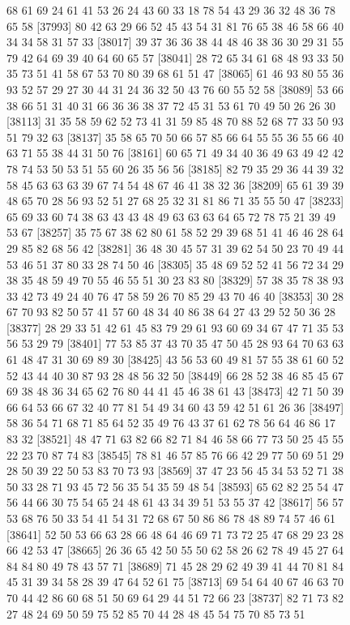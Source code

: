 \documentclass{article}
\begin{document}
\begin{figure}[H]
\begin{Schunk}
\begin{Soutput}
[37969] 68 61 69 24 61 41 53 26 24 43 60 33 18 78 54 43 29 36 32 48 36 78 65 58
[37993] 80 42 63 29 66 52 45 43 54 31 81 76 65 38 46 58 66 40 34 34 58 31 57 33
[38017] 39 37 36 36 38 44 48 46 38 36 30 29 31 55 79 42 64 69 39 40 64 60 65 57
[38041] 28 72 65 34 61 68 48 93 33 50 35 73 51 41 58 67 53 70 80 39 68 61 51 47
[38065] 61 46 93 80 55 36 93 52 57 29 27 30 44 31 24 36 32 50 43 76 60 55 52 58
[38089] 53 66 38 66 51 31 40 31 66 36 36 38 37 72 45 31 53 61 70 49 50 26 26 30
[38113] 31 35 58 59 62 52 73 41 31 59 85 48 70 88 52 68 77 33 50 93 51 79 32 63
[38137] 35 58 65 70 50 66 57 85 66 64 55 55 36 55 66 40 63 71 55 38 44 31 50 76
[38161] 60 65 71 49 34 40 36 49 63 49 42 42 78 74 53 50 53 51 55 60 26 35 56 56
[38185] 82 79 35 29 36 44 39 32 58 45 63 63 63 39 67 74 54 48 67 46 41 38 32 36
[38209] 65 61 39 39 48 65 70 28 56 93 52 51 27 68 25 32 31 81 86 71 35 55 50 47
[38233] 65 69 33 60 74 38 63 43 43 48 49 63 63 63 64 65 72 78 75 21 39 49 53 67
[38257] 35 75 67 38 62 80 61 58 52 29 39 68 51 41 46 46 28 64 29 85 82 68 56 42
[38281] 36 48 30 45 57 31 39 62 54 50 23 70 49 44 53 46 51 37 80 33 28 74 50 46
[38305] 35 48 69 52 52 41 56 72 34 29 38 35 48 59 49 70 55 46 55 51 30 23 83 80
[38329] 57 38 35 78 38 93 33 42 73 49 24 40 76 47 58 59 26 70 85 29 43 70 46 40
[38353] 30 28 67 70 93 82 50 57 41 57 60 48 34 40 86 38 64 27 43 29 52 50 36 28
[38377] 28 29 33 51 42 61 45 83 79 29 61 93 60 69 34 67 47 71 35 53 56 53 29 79
[38401] 77 53 85 37 43 70 35 47 50 45 28 93 64 70 63 63 61 48 47 31 30 69 89 30
[38425] 43 56 53 60 49 81 57 55 38 61 60 52 52 43 44 40 30 87 93 28 48 56 32 50
[38449] 66 28 52 38 46 85 45 67 69 38 48 36 34 65 62 76 80 44 41 45 46 38 61 43
[38473] 42 71 50 39 66 64 53 66 67 32 40 77 81 54 49 34 60 43 59 42 51 61 26 36
[38497] 58 36 54 71 68 71 85 64 52 35 49 76 43 37 61 62 78 56 64 46 86 17 83 32
[38521] 48 47 71 63 82 66 82 71 84 46 58 66 77 73 50 25 45 55 22 23 70 87 74 83
[38545] 78 81 46 57 85 76 66 42 29 77 50 69 51 29 28 50 39 22 50 53 83 70 73 93
[38569] 37 47 23 56 45 34 53 52 71 38 50 33 28 71 93 45 72 56 35 54 35 59 48 54
[38593] 65 62 82 25 54 47 56 44 66 30 75 54 65 24 48 61 43 34 39 51 53 55 37 42
[38617] 56 57 53 68 76 50 33 54 41 54 31 72 68 67 50 86 86 78 48 89 74 57 46 61
[38641] 52 50 53 66 63 28 66 48 64 46 69 71 73 72 25 47 68 29 23 28 66 42 53 47
[38665] 26 36 65 42 50 55 50 62 58 26 62 78 49 45 27 64 84 84 80 49 78 43 57 71
[38689] 71 45 28 29 62 49 39 41 44 70 81 84 45 31 39 34 58 28 39 47 64 52 61 75
[38713] 69 54 64 40 67 46 63 70 70 44 42 86 60 68 51 50 69 64 29 44 51 72 66 23
[38737] 82 71 73 82 27 48 24 69 50 59 75 52 85 70 44 28 48 45 54 75 70 85 73 51

\end{Soutput}
\end{Schunk}
\end{figure}
\end{document}
